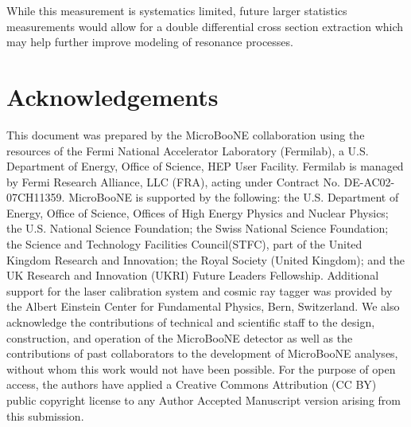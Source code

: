 \documentclass[%
 reprint,
 amsmath,amssymb, longbibliography,
 aps, 
 prd,
 twocolumn,
 showpacs,
 superscriptaddress
]{revtex4-2}
\begin{document}
While this measurement is systematics limited, future larger statistics measurements would allow for a double differential cross section extraction which may help further improve modeling of resonance processes.

\section{Acknowledgements}

This document was prepared by the MicroBooNE collaboration using the resources of the Fermi National Accelerator Laboratory (Fermilab), a U.S. Department of Energy, Office of Science, HEP User Facility. Fermilab is managed by Fermi Research Alliance, LLC (FRA), acting under Contract No. DE-AC02-07CH11359. MicroBooNE is supported by the following: the U.S. Department of Energy, Office of Science, Offices of High Energy Physics and Nuclear Physics; the U.S. National Science Foundation; the Swiss National Science Foundation; the Science and Technology Facilities Council(STFC), part of the United Kingdom Research and Innovation; the Royal Society (United Kingdom); and the UK Research and Innovation (UKRI) Future Leaders Fellowship. Additional support for the laser calibration system and cosmic ray tagger was provided by the Albert Einstein Center for Fundamental Physics, Bern, Switzerland. We also acknowledge the contributions of technical and scientific staff to the design, construction, and operation of the MicroBooNE detector as well as the contributions of past collaborators to the development of MicroBooNE analyses, without whom this work would not have been possible. For the purpose of open access, the authors have applied a Creative Commons Attribution (CC BY) public copyright license to any Author Accepted Manuscript version arising from this submission.
\appendix
\end{document}

